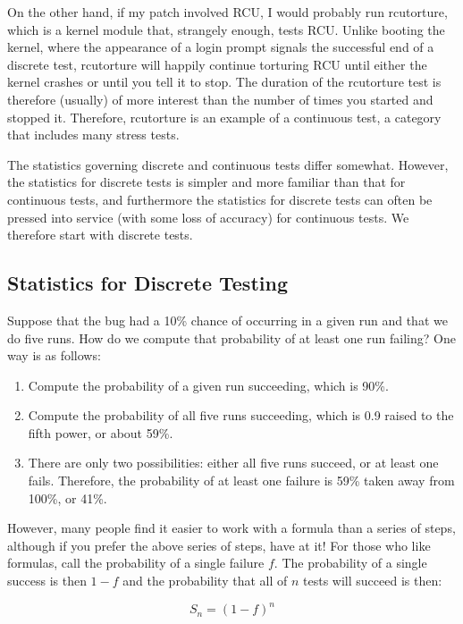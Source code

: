On the other hand, if my patch involved RCU, I would probably run
rcutorture, which is a kernel module that, strangely enough, tests RCU.
Unlike booting the kernel, where the appearance of a login prompt
signals the successful end of a discrete test, rcutorture will happily
continue torturing RCU until either the kernel crashes or until you
tell it to stop.
The duration of the rcutorture test is therefore (usually) of more
interest than the number of times you started and stopped it.
Therefore, rcutorture is an example of a continuous test, a category
that includes many stress tests.

The statistics governing discrete and continuous tests differ somewhat.
However, the statistics for discrete tests is simpler and more
familiar than that for continuous tests, and furthermore the
statistics for discrete tests can often be pressed into service
(with some loss of accuracy) for continuous tests.
We therefore start with discrete tests.

\subsection{Statistics for Discrete Testing}
\label{sec:debugging:Statistics for Discrete Testing}

Suppose that the bug had a 10\% chance of occurring in
a given run and that we do five runs.
How do we compute that probability of at least one run failing?
One way is as follows:

\begin{enumerate}
\item	Compute the probability of a given run succeeding, which is 90\%.
\item	Compute the probability of all five runs succeeding, which
	is 0.9 raised to the fifth power, or about 59\%.
\item	There are only two possibilities: either all five runs succeed,
	or at least one fails.
	Therefore, the probability of at least one failure is
	59\% taken away from 100\%, or 41\%.
\end{enumerate}

However, many people find it easier to work with a formula than a series
of steps, although if you prefer the above series of steps, have at it!
For those who like formulas, call the probability of a single failure $f$.
The probability of a single success is then $1-f$ and the probability
that all of $n$ tests will succeed is then:

\begin{equation}
	S_n = \left(1-f\right)^n
\end{equation}

